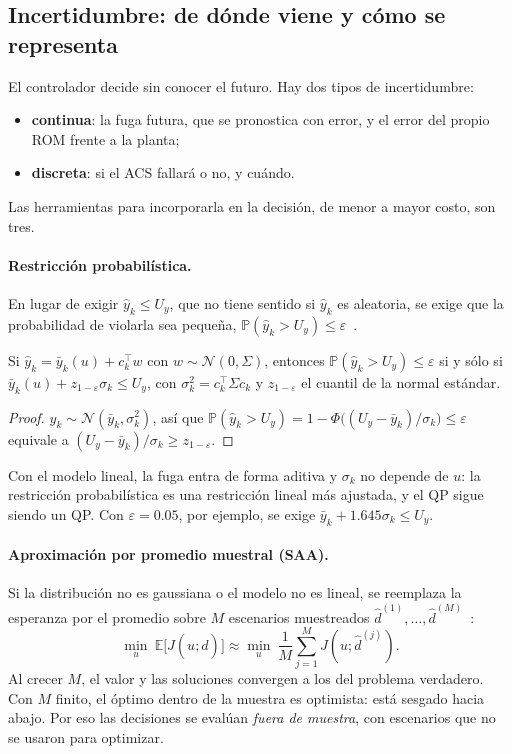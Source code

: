 \subsection{Incertidumbre: de dónde viene y cómo se representa}
El controlador decide sin conocer el futuro. Hay dos tipos de incertidumbre:
\begin{itemize}
  \item \textbf{continua}: la fuga futura, que se pronostica con error, y el error del propio
        ROM frente a la planta;
  \item \textbf{discreta}: si el ACS fallará o no, y cuándo.
\end{itemize}
Las herramientas para incorporarla en la decisión, de menor a mayor costo, son tres.

\paragraph{Restricción probabilística.} En lugar de exigir $\hat y_k\le U_y$, que no tiene
sentido si $\hat y_k$ es aleatoria, se exige que la probabilidad de violarla sea pequeña,
$\mathbb P(\hat y_k>U_y)\le\varepsilon$~\cite{charnes1959}.

\begin{proposicion}\label{prop:cc}
Si $\hat y_k=\bar y_k(u)+c_k^\top w$ con $w\sim\mathcal N(0,\Sigma)$, entonces
$\mathbb P(\hat y_k>U_y)\le\varepsilon$ si y sólo si $\bar y_k(u)+z_{1-\varepsilon}\sigma_k\le U_y$,
con $\sigma_k^2=c_k^\top\Sigma c_k$ y $z_{1-\varepsilon}$ el cuantil de la normal estándar.
\end{proposicion}
\begin{proof}
$\hat y_k\sim\mathcal N(\bar y_k,\sigma_k^2)$, así que
$\mathbb P(\hat y_k>U_y)=1-\Phi\big((U_y-\bar y_k)/\sigma_k\big)\le\varepsilon$ equivale a
$(U_y-\bar y_k)/\sigma_k\ge z_{1-\varepsilon}$.
\end{proof}
\noindent Con el modelo lineal, la fuga entra de forma aditiva y $\sigma_k$ no depende de $u$:
la restricción probabilística es una restricción lineal más ajustada, y el QP sigue siendo un
QP. Con $\varepsilon=0.05$, por ejemplo, se exige $\bar y_k+1.645\sigma_k\le U_y$.

\paragraph{Aproximación por promedio muestral (SAA).} Si la distribución no es gaussiana o el
modelo no es lineal, se reemplaza la esperanza por el promedio sobre $M$ escenarios
muestreados $\hat d^{(1)},\dots,\hat d^{(M)}$~\cite{shapiro2009}:
\[
\min_u\ \mathbb E\big[J(u;\hat d)\big]\approx\min_u\ \frac1M\sum_{j=1}^{M}J(u;\hat d^{(j)}).
\]
Al crecer $M$, el valor y las soluciones convergen a los del problema verdadero. Con $M$ finito,
el óptimo dentro de la muestra es optimista: está sesgado hacia abajo. Por eso las decisiones
se evalúan \emph{fuera de muestra}, con escenarios que no se usaron para optimizar.

